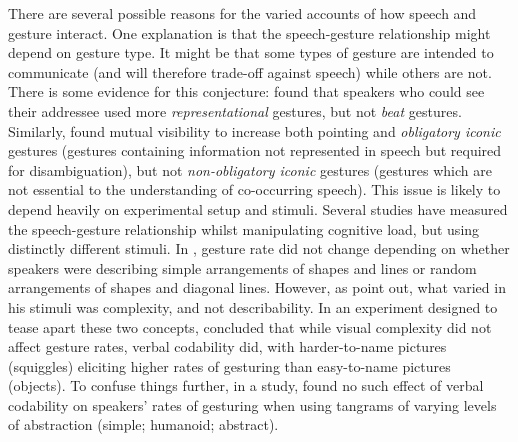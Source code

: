 \documentclass[a4paper,man,natbib]{apa6}
\newcommand*{\term}[1]{\emph{#1}} %
\begin{document}
There are several possible reasons for the varied accounts of how speech and gesture interact. 
One explanation is that the speech-gesture relationship might depend on gesture type.
It might be that some types of gesture are intended to communicate (and will therefore trade-off against speech) while others are not.
There is some evidence for this conjecture: \citet{Alibali2001} found that speakers who could see their addressee used more \term{representational} gestures, but not \term{beat} gestures. 
Similarly, \citet{DeRuiter2012} found mutual visibility to increase both pointing and \term{obligatory iconic} gestures (gestures containing information not represented in speech but required for disambiguation), but not \term{non-obligatory iconic} gestures (gestures which are not essential to the understanding of co-occurring speech).
This issue is likely to depend heavily on experimental setup and stimuli.
Several studies have measured the speech-gesture relationship whilst manipulating cognitive load, but using distinctly different stimuli.
In \citet{DeRuiter1998}, gesture rate did not change depending on whether speakers were describing simple arrangements of shapes and lines or random arrangements of shapes and diagonal lines.
However, as \citet{Morsella2004} point out, what \citeauthor{DeRuiter1998} varied in his stimuli was complexity, and not describability. 
In an experiment designed to tease apart these two concepts, \citet{Morsella2004} concluded that while visual complexity did not affect gesture rates, verbal codability did, with harder-to-name pictures (squiggles) eliciting higher rates of gesturing than easy-to-name pictures (objects).
To confuse things further, in a \citeyear{DeRuiter2012} study, \citeauthor{DeRuiter2012} found no such effect of verbal codability on speakers' rates of gesturing when using tangrams of varying levels of abstraction (simple; humanoid; abstract).

\end{document}
